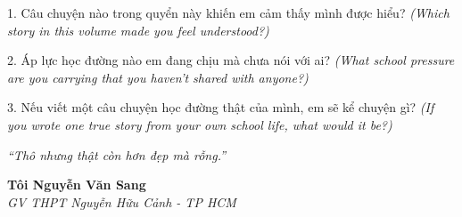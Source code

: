 \begin{tuhocnhanh}
1. Câu chuyện nào trong quyển này khiến em cảm thấy mình được hiểu? \textit{(Which story in this volume made you feel understood?)}

2. Áp lực học đường nào em đang chịu mà chưa nói với ai? \textit{(What school pressure are you carrying that you haven't shared with anyone?)}

3. Nếu viết một câu chuyện học đường thật của mình, em sẽ kể chuyện gì? \textit{(If you wrote one true story from your own school life, what would it be?)}
\end{tuhocnhanh}

\begin{center}
\textit{\color{truyengold}``Thô nhưng thật còn hơn đẹp mà rỗng.''}
\end{center}

\begin{flushright}
\textbf{Tôi Nguyễn Văn Sang}\\
\textit{GV THPT Nguyễn Hữu Cảnh - TP HCM}
\end{flushright}

\ngancach
